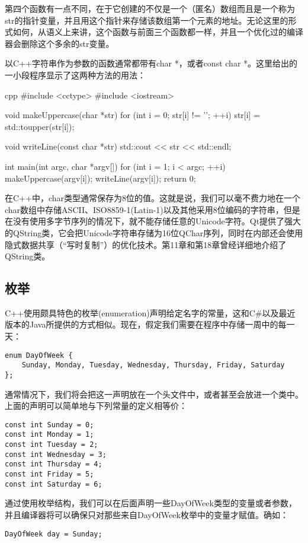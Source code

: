 \documentclass[11pt,oneside]{book}
\begin{document}
\begin{common-format}
第四个函数有一点不同，在于它创建的不仅是一个（匿名）数组而且是一个称为str的指针变量，并且用这个指针来存储该数组第一个元素的地址。无论这里的形式如何，从语义上来讲，这个函数与前面三个函数都一样，并且一个优化过的编译器会删除这个多余的str变量。

以C++字符串作为参数的函数通常都带有char *，或者const char *。这里给出的一小段程序显示了这两种方法的用法：
\begin{tcbcode}[]{cpp}
#include <cctype>
#include <iostream>

void makeUppercase(char *str){
    for (int i = 0; str[i] != '\0'; ++i)
        str[i] = std::toupper(str[i]);
}

void writeLine(const char *str){
    std::cout << str << std::endl;
}

int main(int argc, char *argv[]){
    for (int i = 1; i < argc; ++i) {
        makeUppercase(argv[i]);
        writeLine(argv[i]);
    }
    return 0;
}
\end{tcbcode}

在C++中，char类型通常保存为8位的值。这就是说，我们可以毫不费力地在一个char数组中存储ASCII、ISO8859-1(Latin-1)以及其他采用8位编码的字符串，但是在没有使用多字节序列的情况下，就不能存储任意的Unicode字符。Qt提供了强大的QString类，它会把Unicode字符串存储为16位QChar序列，同时在内部还会使用隐式数据共享（“写时复制”）的优化技术。第11章和第18章曾经详细地介绍了QString类。



\subsection{枚举}
C++使用颇具特色的枚举(enumeration)声明给定名字的常量，这和C\#{}以及最近版本的Java所提供的方式相似。现在，假定我们需要在程序中存储一周中的每一天：
\begin{Verbatim}
enum DayOfWeek {
    Sunday, Monday, Tuesday, Wednesday, Thursday, Friday, Saturday
};
\end{Verbatim}

通常情况下，我们将会把这一声明放在一个头文件中，或者甚至会放进一个类中。上面的声明可以简单地与下列常量的定义相等价：
\begin{Verbatim}
const int Sunday = 0;
const int Monday = 1;
const int Tuesday = 2;
const int Wednesday = 3; 
const int Thursday = 4;
const int Friday = 5;
const int Saturday = 6;
\end{Verbatim}

通过使用枚举结构，我们可以在后面声明一些DayOfWeek类型的变量或者参数，并且编译器将可以确保只对那些来自DayOfWeek枚举中的变量才赋值。确如： 
\begin{Verbatim}
DayOfWeek day = Sunday;
\end{Verbatim}


\end{common-format}
\end{document}
